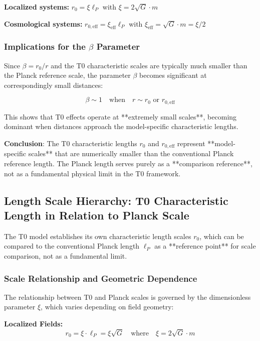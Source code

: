 \documentclass[12pt,a4paper]{article}
\begin{document}
\textbf{Localized systems:} $r_0 = \xi \ell_P$ with $\xi = 2\sqrt{G} \cdot m$

\textbf{Cosmological systems:} $r_{0,\text{eff}} = \xi_{\text{eff}} \ell_P$ with $\xi_{\text{eff}} = \sqrt{G} \cdot m = \xi/2$

\subsubsection{Implications for the $\beta$ Parameter}
\label{subsubsec:beta_implications}

Since $\beta = r_0/r$ and the T0 characteristic scales are typically much smaller than the Planck reference scale, the parameter $\beta$ becomes significant at correspondingly small distances:

\begin{equation}
	\beta \sim 1 \quad \text{when} \quad r \sim r_0 \text{ or } r_{0,\text{eff}}
\end{equation}

This shows that T0 effects operate at **extremely small scales**, becoming dominant when distances approach the model-specific characteristic lengths.

\textbf{Conclusion}: The T0 characteristic lengths $r_0$ and $r_{0,\text{eff}}$ represent **model-specific scales** that are numerically smaller than the conventional Planck reference length. The Planck length serves purely as a **comparison reference**, not as a fundamental physical limit in the T0 framework.
\subsection{Length Scale Hierarchy: T0 Characteristic Length in Relation to Planck Scale}
\label{subsec:planck_comparison}

The T0 model establishes its own characteristic length scales $r_0$, which can be compared to the conventional Planck length $\ell_P$ as a **reference point** for scale comparison, not as a fundamental limit.

\subsubsection{Scale Relationship and Geometric Dependence}
\label{subsubsec:scale_relationship}

The relationship between T0 and Planck scales is governed by the dimensionless parameter $\xi$, which varies depending on field geometry:

\textbf{Localized Fields:}
\begin{equation}
	r_0 = \xi \cdot \ell_P = \xi \sqrt{G} \quad \text{where} \quad \xi = 2\sqrt{G} \cdot m
\end{equation}
\end{document}
